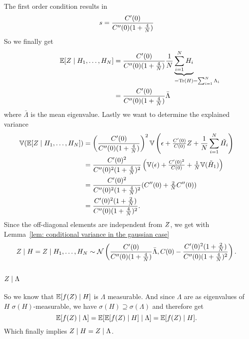 The first order condition results in
\[
	s = \frac{C'(0)}{C''(0)(1+\tfrac4{N})}
\]
So we finally get
\begin{align*}
	\E[\rf\mid H_1,\dots,H_\dimension]
	&= \frac{\sqC'(0)}{\sqC''(0)(1+\tfrac4{\dimension})}
	\frac1\dimension\underbrace{\sum_{i=1}^\dimension H_i}_{
		=\trace(H) \mathrlap{=\sum_{i=1}^\dimension\Lambda_i}
	}\\
	&= \frac{\sqC'(0)}{\sqC''(0)(1+\tfrac4{\dimension})}
	\bar{\Lambda}
\end{align*}
where \(\bar{\Lambda}\) is the mean eigenvalue. Lastly we want to determine
the explained variance
\begin{align*}
	\mathbb{V}(\mathbb{E}[Z\mid H_1,\dots,H_N])
	&= \left(\frac{C'(0)}{C''(0)(1+\tfrac4{N})}\right)^2
	\mathbb{V}\left(
		\epsilon + \tfrac{C'(0)}{C(0)}Z + \frac{1}{N}\sum_{i=1}^N \tilde{H_i}
	\right)\\
	&= \frac{C'(0)^2}{C''(0)^2(1+\tfrac4{N})^2}
	\left(
		\mathbb{V}(\epsilon) + \tfrac{C'(0)^2}{C(0)} + \tfrac1{N}\mathbb{V}(\tilde{H}_1)
	\right)\\
	&= \frac{C'(0)^2}{C''(0)^2(1+\tfrac4{N})^2}
	(C''(0) + \tfrac2{N}C''(0))\\
	&= \frac{C'(0)^2(1+\tfrac2{N})}{C''(0)(1+\tfrac4{N})^2}.
\end{align*}
Since the off-diagonal elements are independent from \(Z\), we get with
Lemma~\ref{lem: conditional variance in the gaussian case}
\[
	Z\mid H = Z \mid H_1,\dots, H_N \sim \mathcal{N}\left(
		\frac{C'(0)}{C''(0)(1+\tfrac4{N})}\bar{\Lambda},
		C(0)-\frac{C'(0)^2(1+\tfrac2{N})}{C''(0)(1+\tfrac4{N})^2}
	\right).
\]

\subsection{\texorpdfstring{\(Z\mid \Lambda\)}{Z|Λ}}

So we know that \(\mathbb{E}[f(Z)\mid H]\) is \(\Lambda\)
measurable. And since \(\Lambda\) are as eigenvalues
of \(H\) \(\sigma(H)\)-measurable, we have \(\sigma(H)\supseteq \sigma(\Lambda)\)
and therefore get
\[
	\mathbb{E}[f(Z)\mid \Lambda]
	= \mathbb{E}[\mathbb{E}[f(Z)\mid H] \mid \Lambda]
	= \mathbb{E}[f(Z)\mid H].
\]
Which finally implies \(Z\mid H = Z\mid \Lambda\).